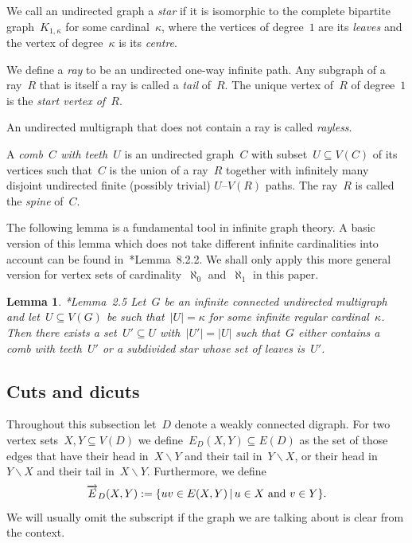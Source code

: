 \documentclass[reqno, 12pt]{amsart}
\numberwithin{equation}{section}
\numberwithin{figure}{section}
\let\setminus=\smallsetminus
\theoremstyle{plain}
\newtheorem{lemma}[thm]{Lemma}
\theoremstyle{definition}
\newcommand{\abs}[1]{\ensuremath{{\lvert {#1} \rvert}}}
\begin{document}
We call an undirected graph a \emph{star} if it is isomorphic to the complete bipartite graph~$K_{1, \kappa}$ for some cardinal~$\kappa$, where the vertices of degree~$1$ are its \emph{leaves} and the vertex of degree~$\kappa$ is its \emph{centre}.

We define a \emph{ray} to be an undirected one-way infinite path. 
Any subgraph of a ray~$R$ that is itself a ray is called a \emph{tail} of~$R$. 
The unique vertex of~$R$ of degree~$1$ is the \emph{start vertex of~$R$}. 


An undirected multigraph that does not contain a ray is called \emph{rayless}. 

A \emph{comb~$C$ with teeth~$U$} is an undirected graph~$C$ with subset~${U \subseteq V(C)}$ of its vertices 
such that~$C$ is the union of a ray~$R$ together with infinitely many disjoint undirected finite (possibly trivial) $U$--$V(R)$ paths. 
The ray~$R$ is called the \textit{spine} of~$C$.

The following lemma is a fundamental tool in infinite graph theory. 
A basic version of this lemma which does not take different infinite cardinalities into account can be found in~\cite{diestel_buch}*{Lemma~8.2.2}. 
We shall only apply this more general version for vertex sets of cardinality~$\aleph_0$ and~$\aleph_1$ in this paper.

\begin{lemma}
    \label{lem:star-comb}
    \cite{star-comb}*{Lemma~2.5}
    Let~$G$ be an infinite connected undirected multigraph and let~${U \subseteq V(G)}$ be such that~${\abs{U} = \kappa}$ for some infinite regular cardinal~$\kappa$.
    Then there exists a set~${U' \subseteq U}$ with~${\abs{U'} = \abs{U}}$ such that~$G$ either contains a comb with teeth~$U'$ or a subdivided star whose set of leaves is~$U'$. 
\end{lemma}






\subsection{Cuts and dicuts}

Throughout this subsection let~$D$ denote a weakly connected digraph.
For two vertex sets~${X, Y \subseteq V(D)}$ we define~${E_D(X, Y) \subseteq E(D)}$ as the set of those edges 
that have their head in~${X \setminus Y}$ and their tail in~${Y \setminus X}$, 
or their head in~${Y \setminus X}$ and their tail in~${X \setminus Y}$. 
Furthermore, we define 
\[
    {\overrightarrow{E}_D(X, Y) := \{ uv \in E(X, Y) \, | \, u \in X \textnormal{ and } v \in Y \}}.
\]
We will usually omit the subscript if the graph we are talking about is clear from the context. 
\end{document}
